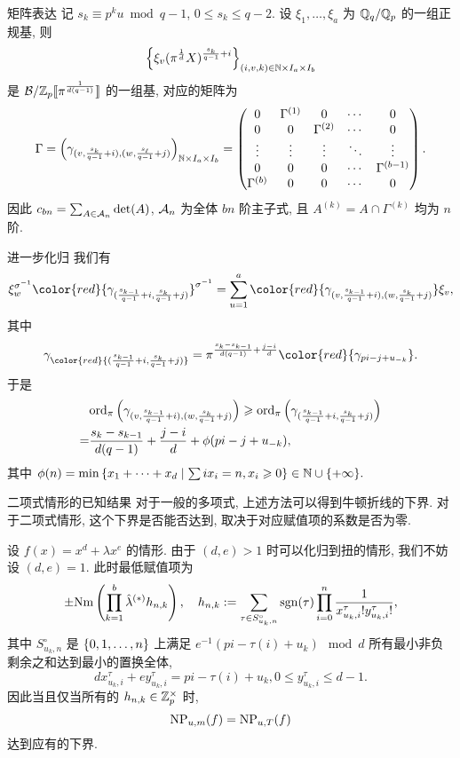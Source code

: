 \documentclass[aspectratio=169,handout]{ctexbeamer}
\newcommand\ldb{\llbracket}
\newcommand\rdb{\rrbracket}
\begin{document}
\begin{frame}{矩阵表达}
记 $s_k\equiv p^k u\bmod{q-1}$, $0\le s_k\le q-2$.
设 $\xi_1,\dots,\xi_a$ 为 ${\mathbb{Q}}_q/{\mathbb{Q}}_p$ 的一组正规基, 则
	\[\Bigl\{\xi_v(\pi^{\frac1d}X)^{\frac{s_k}{q-1}+i}\Bigr\}_{(i,v,k)\in{\mathbb{N}}\times I_a\times I_b}\]
是 $\CB/\BZ_p\ldb\pi^{\frac{1}{d(q-1)}}\rdb$ 的一组基, 对应的矩阵为
	\[
	\Gamma=\Bigl(\gamma_{(v,\frac{s_k}{q-1}+i),(w,\frac{s_\ell}{q-1}+j)}\Bigr)_{{\mathbb{N}}\times I_a\times I_b}=\begin{pmatrix}
		0&\Gamma^{(1)}&0&\cdots&0\\
		0&0&\Gamma^{(2)}&\cdots&0\\
		\vdots&\vdots&\vdots&\ddots&\vdots\\
		0&0&0&\cdots&\Gamma^{(b-1)}\\
		\Gamma^{(b)}&0&0&\cdots&0
	\end{pmatrix}.
	\]
因此 $c_{bn}=\sum_{A\in{\mathcal{A}}_n} \det(A)$, ${\mathcal{A}}_n$ 为全体 $bn$ 阶主子式, 且 $A^{(k)}=A\cap \Gamma^{(k)}$ 均为 $n$ 阶.
\end{frame}

\begin{frame}{进一步化归}
我们有
\vspace{-2mm}
	\[\xi_w^{\sigma^{-1}}{\color{red}{\gamma_{(\frac{s_{k-1}}{q-1}+i,\frac{s_k}{q-1}+j)}}}^{\sigma^{-1}}=\sum_{u=1}^a {\color{red}{\gamma_{(v,\frac{s_{k-1}}{q-1}+i),(w,\frac{s_k}{q-1}+j)}}}\xi_v,\]
\vspace{-2mm}
其中
\vspace{-2mm}
	\[\gamma_{\color{red}{(\frac{s_{k-1}}{q-1}+i,\frac{s_k}{q-1}+j)}}
	=\pi^{\frac{s_k-s_{k-1}}{d(q-1)}+\frac{j-i}{d}}{\color{red}{\gamma_{pi-j+u_{-k}}}}.\]
于是
	\[
	\begin{split}
	&{\mathrm{ord}}_\pi\left(\gamma_{(v,\frac{s_{k-1}}{q-1}+i),(w,\frac{s_k}{q-1}+j)}\right)\geqslant {\mathrm{ord}}_\pi\left(\gamma_{(\frac{s_{k-1}}{q-1}+i,\frac{s_k}{q-1}+j)}\right)\\
	=&\frac{s_k-s_{k-1}}{d(q-1)}+\frac{j-i}{d}+\phi(pi-j+u_{-k}),
	\end{split}
	\]
其中 $\phi(n)=\min{\left\{x_1+\cdots+x_d\mid \sum ix_i=n,x_i\geqslant0\right\}}\in{\mathbb{N}}\cup{\left\{+\infty\right\}}.$
\end{frame}


\begin{frame}{二项式情形的已知结果}
对于一般的多项式, 上述方法可以得到牛顿折线的下界.
对于二项式情形, 这个下界是否能否达到, 取决于对应赋值项的系数是否为零.

设 $f(x)=x^d+\lambda x^e$ 的情形. 由于 $(d,e)>1$ 时可以化归到扭的情形, 我们不妨设 $(d,e)=1$.
此时最低赋值项为
	\[\pm{\mathrm{Nm}}\left(\prod_{k=1}^b \hat\lambda^{(*)} h_{n,k}\right),\quad
	h_{n,k}:=\sum_{\tau\in S_{u_k,n}^\circ}\operatorname{sgn}(\tau)\prod_{i=0}^n\frac{1}{x_{u_k,i}^\tau!y_{u_k,i}^\tau!},
	\]
其中 $S_{u_k,n}^\circ$ 是 ${\left\{0,1,\dots,n\right\}}$ 上满足 $e^{-1}(pi-\tau(i)+u_k)\mod d$ 所有最小非负剩余之和达到最小的置换全体,
	\[dx_{u_k,i}^\tau+ey_{u_k,i}^\tau=pi-\tau(i)+u_k,0\le y_{u_k,i}^\tau\le d-1.\]
因此当且仅当所有的 $h_{n,k}\in{\mathbb{Z}}_p^\times$ 时,
	\[{\mathrm{NP}}_{u,m}(f)={\mathrm{NP}}_{u,T}(f)\]
达到应有的下界.
\end{frame}
\end{document}
